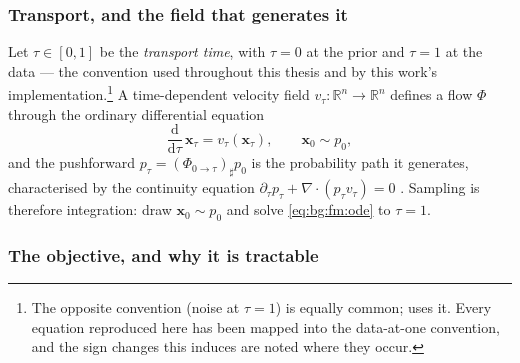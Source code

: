 \documentclass[headsepline,footsepline,footinclude=false,oneside,fontsize=11pt,paper=a4,listof=totoc,bibliography=totoc]{scrbook}
\theoremstyle{definition}
\theoremstyle{plain}
\theoremstyle{remark}
\newcommand{\vect}[1]{\boldsymbol{#1}}
\newcommand{\R}{\mathbb{R}}                    %
\newcommand{\dd}{\mathrm{d}}                   %
\newcommand{\vfield}{v}                        %
\newcommand{\ftime}{\tau}                      %
\begin{document}
\subsubsection*{Transport, and the field that generates it}

Let $\ftime \in [0,1]$ be the \emph{transport time}, with $\ftime = 0$ at the prior and
$\ftime = 1$ at the data --- the convention used throughout this thesis and by this work's
implementation.\footnote{The opposite convention (noise at $\ftime=1$) is equally common;
\parencite{geng2025meanflow} uses it. Every equation reproduced here has been mapped into the
data-at-one convention, and the sign changes this induces are noted where they occur.}
A time-dependent velocity field $\vfield_{\ftime}:\R^{n}\to\R^{n}$ defines a flow
$\Phi$ through the ordinary differential equation
\begin{equation}\label{eq:bg:fm:ode}
  \frac{\dd}{\dd\ftime}\,\vect{x}_{\ftime} = \vfield_{\ftime}(\vect{x}_{\ftime}),
  \qquad \vect{x}_{0} \sim p_{0},
\end{equation}
and the pushforward $p_{\ftime} = (\Phi_{0\to\ftime})_{\sharp}p_{0}$ is the probability path
it generates, characterised by the continuity equation
$\partial_{\ftime}p_{\ftime} + \nabla\!\cdot(p_{\ftime}\vfield_{\ftime}) = 0$
\parencite[Sec.~2]{lipman2023flow}. Sampling is therefore integration: draw $\vect{x}_{0}\sim p_{0}$ and
solve \eqref{eq:bg:fm:ode} to $\ftime = 1$.

\subsubsection*{The objective, and why it is tractable}
\end{document}
